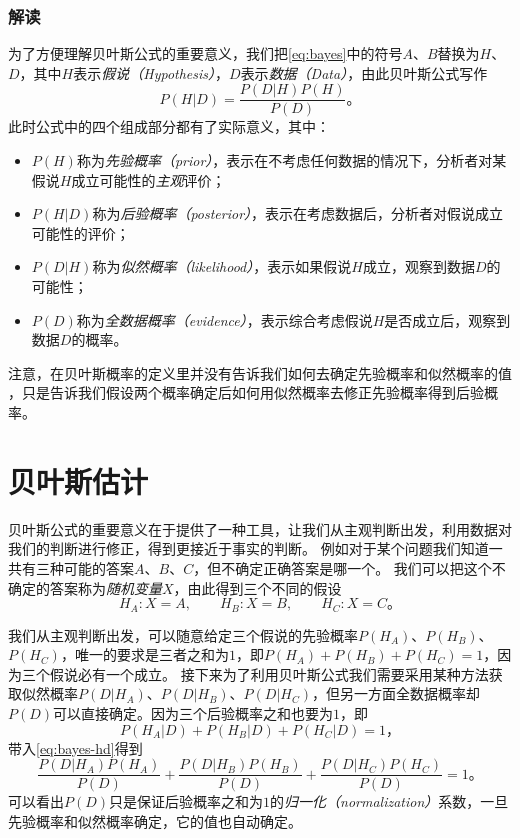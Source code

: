 \subsubsection{解读}
为了方便理解贝叶斯公式的重要意义，我们把\cref{eq:bayes}中的符号$A$、$B$替换为$H$、$D$，其中$H$表示\emph{假说（Hypothesis）}，$D$表示\emph{数据（Data）}，由此贝叶斯公式写作
\begin{equation}\label{eq:bayes-hd}
    P(H|D)=\frac{P(D|H)P(H)}{P(D)}。
\end{equation}
此时公式中的四个组成部分都有了实际意义，其中：
\begin{itemize}
    \item $P(H)$称为\emph{先验概率（prior）}，表示在不考虑任何数据的情况下，分析者对某假说$H$成立可能性的\emph{主观}评价；
    \item $P(H|D)$称为\emph{后验概率（posterior）}，表示在考虑数据后，分析者对假说成立可能性的评价；
    \item $P(D|H)$称为\emph{似然概率（likelihood）}，表示如果假说$H$成立，观察到数据$D$的可能性；
    \item $P(D)$称为\emph{全数据概率（evidence）}，表示综合考虑假说$H$是否成立后，观察到数据$D$的概率。
\end{itemize}

注意，在贝叶斯概率的定义里并没有告诉我们如何去确定先验概率和似然概率的值%
，只是告诉我们假设两个概率确定后如何用似然概率去修正先验概率得到后验概率。

\section{贝叶斯估计}

贝叶斯公式的重要意义在于提供了一种工具，让我们从主观判断出发，利用数据对我们的判断进行修正，得到更接近于事实的判断。
例如对于某个问题我们知道一共有三种可能的答案$A$、$B$、$C$，但不确定正确答案是哪一个。
我们可以把这个不确定的答案称为\emph{随机变量}$X$，由此得到三个不同的假设
\begin{equation*}
    H_A:X=A,\qquad H_B:X=B,\qquad H_C:X=C。
\end{equation*}

我们从主观判断出发，可以随意给定三个假说的先验概率$P(H_A)$、$P(H_B)$、$P(H_C)$，唯一的要求是三者之和为$1$，即$P(H_A)+P(H_B)+P(H_C)=1$，因为三个假说必有一个成立。
接下来为了利用贝叶斯公式我们需要采用某种方法获取似然概率$P(D|H_A)$、$P(D|H_B)$、$P(D|H_C)$，但另一方面全数据概率却$P(D)$可以直接确定。因为三个后验概率之和也要为$1$，即
\begin{equation*}
    P(H_A|D)+P(H_B|D)+P(H_C|D)=1，
\end{equation*}
带入\cref{eq:bayes-hd}得到
\begin{equation}
    \frac{P(D|H_A)P(H_A)}{P(D)}+\frac{P(D|H_B)P(H_B)}{P(D)}+\frac{P(D|H_C)P(H_C)}{P(D)}=1。
\end{equation}
可以看出$P(D)$只是保证后验概率之和为$1$的\emph{归一化（normalization）}系数，一旦先验概率和似然概率确定，它的值也自动确定。


